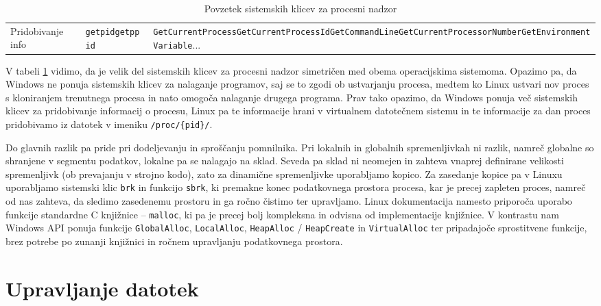 \documentclass[a4paper,12pt,openright]{book}
\begin{document}
\begin{table}[h!]
\begin{center}
\begin{tabular}{ p{3.7cm}|p{2.5cm}|p{6cm} }
			Pridobivanje info & \verb|getpid|\newline\verb|getppid|                    & \verb|GetCurrentProcess|\newline\verb|GetCurrentProcessId|\newline\verb|GetCommandLine|\newline\verb|GetCurrentProcessorNumber|\newline\verb|GetEnvironmentVariable|\newline... \\
		\end{tabular}
	\end{center}
	\label{tab:process_control}
	\caption{Povzetek sistemskih klicev za procesni nadzor}
\end{table}

V tabeli \ref{tab:process_control} vidimo, da je velik del sistemskih klicev za procesni nadzor simetričen med obema operacijskima sistemoma.
Opazimo pa, da Windows ne ponuja sistemskih klicev za nalaganje programov, saj se to zgodi ob ustvarjanju procesa, medtem ko Linux ustvari nov proces s kloniranjem trenutnega procesa in nato omogoča nalaganje drugega programa.
Prav tako opazimo, da Windows ponuja več sistemskih klicev za pridobivanje informacij o procesu, Linux pa te informacije hrani v virtualnem datotečnem sistemu in te informacije za dan proces pridobivamo iz datotek v imeniku \verb|/proc/{pid}/|.

Do glavnih razlik pa pride pri dodeljevanju in sproščanju pomnilnika. Pri lokalnih in globalnih spremenljivkah ni razlik, namreč globalne so shranjene v segmentu podatkov, lokalne pa se nalagajo na sklad.
Seveda pa sklad ni neomejen in zahteva vnaprej definirane velikosti spremenljivk (ob prevajanju v strojno kodo), zato za dinamične spremenljivke uporabljamo kopico.
Za zasedanje kopice pa v Linuxu uporabljamo sistemski klic \verb|brk| in funkcijo \verb|sbrk|, ki premakne konec podatkovnega prostora procesa, kar je precej zapleten proces, namreč od nas zahteva, da sledimo zasedenemu prostoru in ga ročno čistimo ter upravljamo. Linux dokumentacija namesto priporoča uporabo funkcije standardne C knjižnice -- \verb|malloc|, ki pa je precej bolj kompleksna in odvisna od implementacije knjižnice.
V kontrastu nam Windows API ponuja funkcije \verb|GlobalAlloc|, \verb|LocalAlloc|, \verb|HeapAlloc| / \verb|HeapCreate| in \verb|VirtualAlloc| ter pripadajoče sprostitvene funkcije, brez potrebe po zunanji knjižnici in ročnem upravljanju podatkovnega prostora.

\section{Upravljanje datotek}
\end{document}
